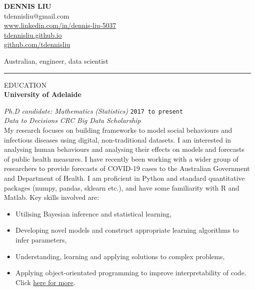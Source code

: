 \documentclass{article}
\newcommand{\HRule}{\rule{\linewidth}{0.5mm}}
\begin{document}
\begin{center} 

\textbf{\huge{DENNIS LIU}}
\\[0.5cm]

tdennisliu@gmail.com \\
\url{www.linkedin.com/in/dennis-liu-5037} \\
\url{tdennisliu.github.io}\\
\small{\url{github.com/tdennisliu}}

\end{center}
\begin{flushright}
Australian, engineer, data scientist 	
\end{flushright}



\HRule

{\footnotesize EDUCATION}
\\

\textbf{\large University of Adelaide} 

\emph{Ph.D candidate: Mathematics (Statistics)} \hfill \texttt{2017 to present}\\[0.2cm]
{\emph{Data to Decisions CRC Big Data Scholarship}}\\

My research focuses on building frameworks to model social behaviours and infectious diseases using digital, non-traditional datasets. I am interested in analysing human behaviours and analysing their effects on models and forecasts of public health measures. I have recently been working with a wider group of researchers to provide forecasts of COVID-19 cases to the Australian Government and Department of Health. I am proficient in Python and standard quantitative packages (numpy, pandas, sklearn etc.), and have some familiarity with R and Matlab.
\hypersetup{urlcolor=black}
Key skills involved are:

\begin{itemize}
	\item Utilising Bayesian inference and statistical learning,
	\item Developing novel models and construct appropriate learning algorithms to infer parameters,
	\item Understanding, learning and applying solutions to complex problems,
	\item Applying object-orientated programming to improve interpretability of code. Click \href{https://tdennisliu.github.io/tutorials/1-simple-search-and-recursion.html#Towers-of-Hanoi}{here for more}.
\end{itemize}
\end{document}
